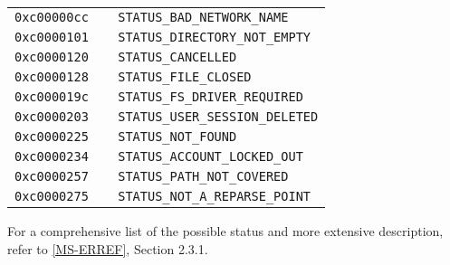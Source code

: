 \documentclass[documentation]{subfiles}
\begin{document}
\begin{longtable}{>{\tt}r>{\tt}l}
    0xc00000cc & STATUS\_BAD\_NETWORK\_NAME\\
    0xc0000101 & STATUS\_DIRECTORY\_NOT\_EMPTY\\
    0xc0000120 & STATUS\_CANCELLED\\
    0xc0000128 & STATUS\_FILE\_CLOSED\\
    0xc000019c & STATUS\_FS\_DRIVER\_REQUIRED\\
    0xc0000203 & STATUS\_USER\_SESSION\_DELETED\\
    0xc0000225 & STATUS\_NOT\_FOUND\\
    0xc0000234 & STATUS\_ACCOUNT\_LOCKED\_OUT\\
    0xc0000257 & STATUS\_PATH\_NOT\_COVERED\\
    0xc0000275 & STATUS\_NOT\_A\_REPARSE\_POINT\\
    \bottomrule
\end{longtable}

For a comprehensive list of the possible status and more extensive description, refer to \href{https://msdn.microsoft.com/en-us/library/cc231196.aspx}{[MS-ERREF]}, Section 2.3.1.
\end{document}
